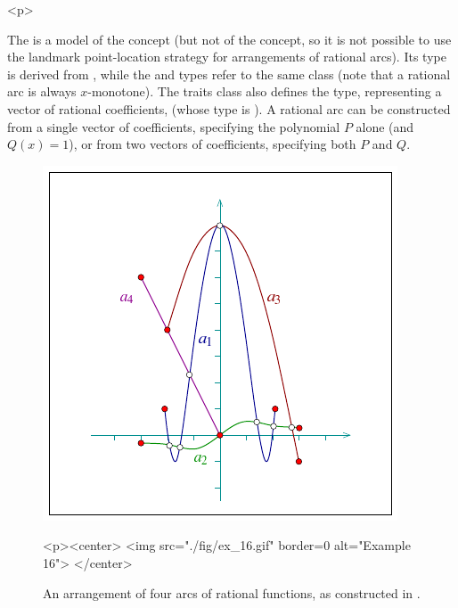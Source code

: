 \begin{ccHtmlOnly}<p>\end{ccHtmlOnly}
The  is a model of the
 concept (but not of the
 concept, so it is not possible
to use the landmark point-location strategy for arrangements of
rational arcs). Its  type is derived from
, while the  and
 types refer to the same class (note that
a rational arc is always $x$-monotone). The traits class also
defines the  type, representing a vector of
rational coefficients, (whose type is ). A
rational arc can be constructed from a single vector of
coefficients, specifying the polynomial $P$ alone (and $Q(x) =
1$), or from two vectors of coefficients, specifying both $P$ and
$Q$.

\begin{figure}[!htp]
\begin{ccTexOnly}
  \begin{center}
  \includegraphics{Arrangement_2/fig/ex_16}
  \end{center}
\end{ccTexOnly}
\begin{ccHtmlOnly}
  <p><center>
  <img src="./fig/ex_16.gif" border=0 alt="Example 16">
  </center>
\end{ccHtmlOnly}
\caption{An arrangement of four arcs of rational functions, as
constructed in .}
\label{arr_fig:ex_16}
\end{figure}

